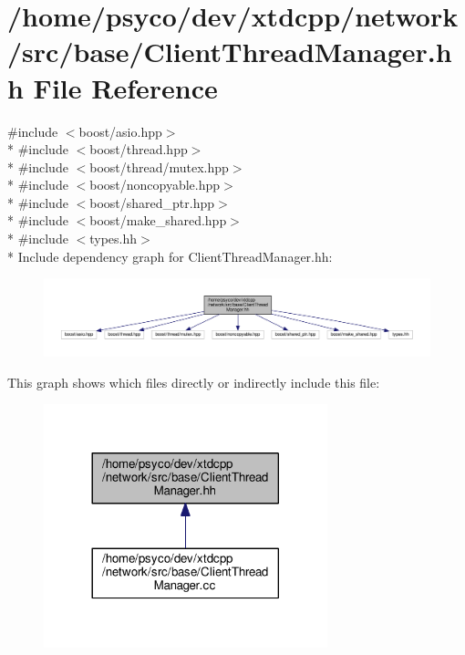 \hypertarget{ClientThreadManager_8hh}{}\section{/home/psyco/dev/xtdcpp/network/src/base/\+Client\+Thread\+Manager.hh File Reference}
\label{ClientThreadManager_8hh}
{\ttfamily \#include $<$boost/asio.\+hpp$>$}\\*
{\ttfamily \#include $<$boost/thread.\+hpp$>$}\\*
{\ttfamily \#include $<$boost/thread/mutex.\+hpp$>$}\\*
{\ttfamily \#include $<$boost/noncopyable.\+hpp$>$}\\*
{\ttfamily \#include $<$boost/shared\+\_\+ptr.\+hpp$>$}\\*
{\ttfamily \#include $<$boost/make\+\_\+shared.\+hpp$>$}\\*
{\ttfamily \#include $<$types.\+hh$>$}\\*
Include dependency graph for Client\+Thread\+Manager.\+hh\+:
\nopagebreak
\begin{figure}[H]
\begin{center}
\leavevmode
\includegraphics[width=350pt]{ClientThreadManager_8hh__incl}
\end{center}
\end{figure}
This graph shows which files directly or indirectly include this file\+:
\nopagebreak
\begin{figure}[H]
\begin{center}
\leavevmode
\includegraphics[width=233pt]{ClientThreadManager_8hh__dep__incl}
\end{center}
\end{figure}
